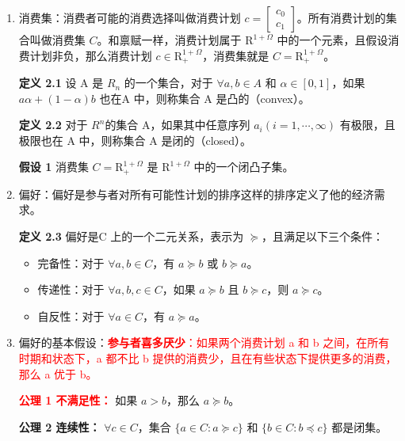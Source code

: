 \begin{tcolorbox}[knowledge,title=2.2 经济参与者]
\begin{enumerate}
\item 消费集：消费者可能的消费选择叫做消费计划 $c=\begin{bmatrix}
    c_0 \\ c_1
\end{bmatrix}$。所有消费计划的集合叫做消费集 $C$。和禀赋一样，消费计划属于 $\mathrm{R}^{1+\Omega}$ 中的一个元素，且假设消费计划非负，那么消费计划 $c \in \mathrm{R}^{1+\Omega}_{+}$，消费集就是 $C=\mathrm{R}^{1+\Omega}_{+}$。

\begin{tcolorbox}[knowledge]
\textbf{定义 2.1} 设 A 是 $R_n$ 的一个集合，对于 $\forall a,b \in A$ 和 $\alpha \in [0,1]$，如果 $a\alpha+(1-\alpha)b$ 也在A 中，则称集合 A 是凸的（convex）。

\textbf{定义 2.2} 对于 $R^n$的集合 A，如果其中任意序列 $a_i(i=1,\cdots,\infty)$ 有极限，且极限也在 A 中，则称集合 A 是闭的（closed）。

\textbf{假设 1} 消费集 $C=\mathrm{R}^{1+\Omega}_{+}$ 是 $\mathrm{R}^{1+\Omega}$ 中的一个闭凸子集。
\end{tcolorbox}

\item 偏好：偏好是参与者对所有可能性计划的排序这样的排序定义了他的经济需求。

\begin{tcolorbox}[knowledge]
\textbf{定义 2.3} 偏好是C 上的一个二元关系，表示为 $\succeq$，且满足以下三个条件：
\begin{itemize}
    \item 完备性：对于 $\forall a,b \in C$，有 $a\succeq b$ 或 $b\succeq a$。
    \item 传递性：对于 $\forall a,b,c \in C$，如果 $a\succeq b$ 且 $b\succeq c$，则 $a\succeq c$。
    \item 自反性：对于 $\forall a \in C$，有 $a\succeq a$。
\end{itemize}
\end{tcolorbox}

\item 偏好的基本假设：\textcolor{red}{\textbf{参与者喜多厌少}：如果两个消费计划 a 和 b 之间，在所有时期和状态下，a 都不比 b 提供的消费少，且在有些状态下提供更多的消费，那么 a 优于 b。}
    \begin{tcolorbox}[knowledge]
        \textcolor{red}{\textbf{公理 1 不满足性：}} 如果 $a>b$，那么 $a\succeq b$。

        \textbf{公理 2 连续性：} $\forall c \in C$，集合 $\{a\in C: a\succeq c\}$ 和 $\{b\in C: b\preceq c\}$ 都是闭集。


\end{tcolorbox}
\end{enumerate}
\end{tcolorbox}
